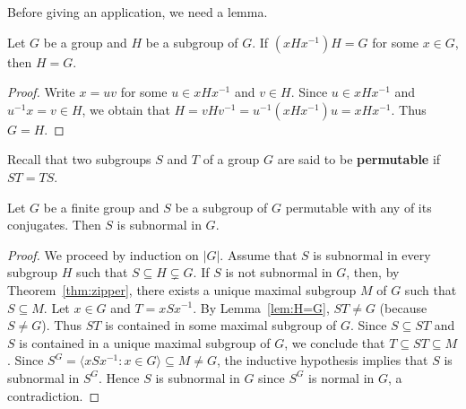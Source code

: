 Before giving an application, we need a lemma. 

\begin{lemma}
	\label{lem:H=G}
	Let $G$ be a group and $H$ be a subgroup of $G$. If $(xHx^{-1})H=G$ for some 
	$x\in G$, then $H=G$.
\end{lemma}

\begin{proof}
	Write $x=uv$ for some $u\in xHx^{-1}$ and $v\in H$. Since $u\in xHx^{-1}$ and
	$u^{-1}x=v\in H$, we obtain that $H=vHv^{-1}=u^{-1}(xHx^{-1})u=xHx^{-1}$. Thus
	$G=H$. 
\end{proof}

Recall that two subgroups $S$ and $T$ of a group $G$ are said to be
\textbf{permutable} if $ST=TS$. 

\begin{theorem}
	Let $G$ be a finite group and $S$ be a subgroup of $G$ permutable with any of
	its conjugates. Then $S$ is subnormal in $G$. 
\end{theorem}

\begin{proof}
	We proceed by induction on $|G|$. Assume that $S$ is subnormal in 
	every subgroup $H$ such that $S\subseteq H\subsetneq G$.  If $S$ is not subnormal in $G$, 
	then, by Theorem~\ref{thm:zipper}, there exists a unique maximal subgroup $M$ of $G$ 
	such that $S\subseteq M$. Let $x\in G$ and 
	$T=xSx^{-1}$. By Lemma~\ref{lem:H=G}, $ST\ne G$ (because $S\ne G$). Thus 
	$ST$ is contained in some maximal subgroup of $G$. Since 
	$S\subseteq ST$ and $S$ is contained in a unique maximal subgroup of $G$, we conclude that 
	$T\subseteq ST\subseteq M$.  Since $S^G=\langle xSx^{-1}:x\in
	G\rangle\subseteq M\ne G$, the inductive hypothesis implies that $S$ is subnormal in
	$S^G$. Hence $S$ is subnormal in $G$ since $S^G$ is normal in $G$, a contradiction. 
\end{proof}

